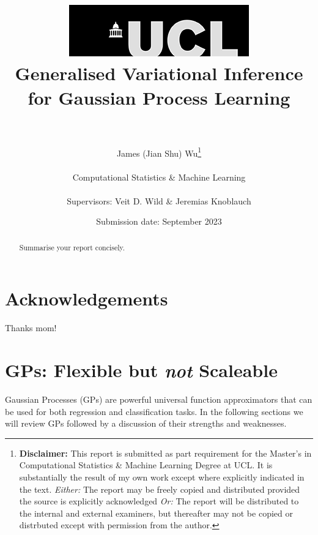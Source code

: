 \documentclass{article}
\title{  	{ \includegraphics[scale=.5]{ucl_logo.png}}\\
{{\Huge Generalised Variational Inference for Gaussian Process Learning}}\\
{\large }\\
		}
\date{Submission date: September 2023}
\author{James (Jian Shu) Wu\thanks{
{\bf Disclaimer:}
This report is submitted as part requirement for the Master's in Computational Statistics \& Machine Learning Degree at UCL. It is
substantially the result of my own work except where explicitly indicated in the text.
\newline  %
\emph{Either: }The report may be freely copied and distributed provided the source is explicitly acknowledged
\newline  %
\emph{Or: }The report will be distributed to the internal and external examiners, but thereafter may not be copied or distrbuted except with permission from the author.}
\\ \\
Computational Statistics \& Machine Learning\\ \\
Supervisors: Veit D. Wild \& Jeremias Knoblauch}
\numberwithin{equation}{section}
\begin{document}
\onehalfspacing
\maketitle
{}
\newpage
\setcounter{page}{1}
\section*{Acknowledgements}
Thanks mom!
\newpage

\begin{abstract}
Summarise your report concisely.
\end{abstract}
\newpage
\tableofcontents
\newpage
{}
\setcounter{page}{1}
\section{GPs: Flexible but \textit{not} Scaleable}
Gaussian Processes (GPs) are powerful universal function approximators that can be used for both regression and classification tasks. In the following sections we will review GPs followed by a discussion of their strengths and weaknesses.
\end{document}
